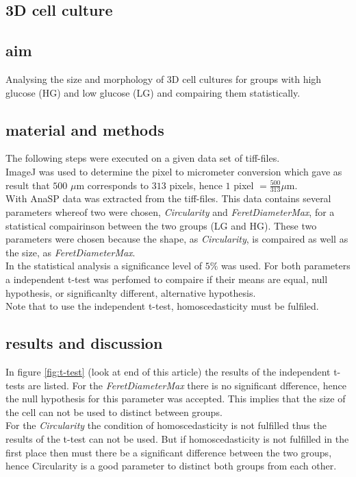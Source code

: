 \documentclass[dutch, a4paper, 11pt]{article}
\begin{document}
\begin{multicols}{2}

\section{3D cell culture}

\subsection{aim}

Analysing the size and morphology of 3D cell cultures for groups with high glucose (HG)
and low glucose (LG) and compairing them statistically.

\subsection{material and methods}

The following steps were executed on a given data set of tiff-files.\\
ImageJ was used to determine the pixel to micrometer conversion which gave as result that 
$500$ $\mu$m  corresponds to $313$ pixels, hence $1$ pixel $=\frac{500}{313}\mu$m.\\
With AnaSP data was extracted from the tiff-files. This data contains several parameters whereof two were chosen, 
\emph{Circularity} and \emph{FeretDiameterMax}, for a statistical compairinson between the two groups (LG and HG).
These two parameters were chosen because the shape, as \emph{Circularity}, is compaired as well as the size, as \emph{FeretDiameterMax}.\\
In the statistical analysis a significance level of $5\%$ was used. For both parameters a independent t-test
was perfomed to compaire if their means are equal, null hypothesis, or significanlty different, alternative hypothesis.\\
Note that to use the independent t-test, homoscedasticity must be fulfiled.

\subsection{results and discussion}

In figure \ref{fig:t-test} (look at end of this article) the results of the independent t-tests are listed. For the \emph{FeretDiameterMax} there is no significant dfference, hence the null hypothesis for this 
parameter was accepted. This implies that the size of the cell can not be used to distinct between groups.\\
For the \emph{Circularity} the condition of homoscedasticity is not fulfilled thus the results of the t-test can not be used. But if homoscedasticity is not fulfilled in the first place then
must there be a significant difference between the two groups, hence Circularity is a good parameter to distinct both groups from each other.


\end{multicols}
\end{document}
